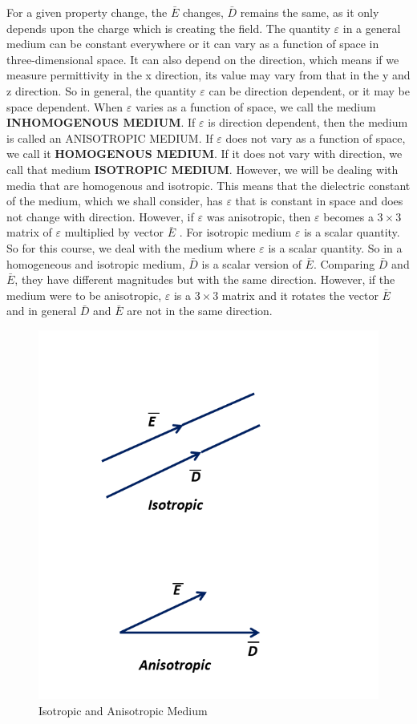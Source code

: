 \begin{mdframed}[ backgroundcolor=lightblue, linewidth=1pt, hidealllines=true]
For a given property change, the $\bar{E}$ changes, $\bar{D}$ remains the same, as it only depends upon the charge which is creating the field. The quantity $\varepsilon$ in a general medium can be constant everywhere or it can vary as a function of space in three-dimensional space. It can also depend on the direction, which means if we measure permittivity in the x direction, its value may vary from that in the y and z direction. So in general, the quantity  $\varepsilon$  can be direction dependent, or it may be space dependent. When  $\varepsilon$  varies as a function of space, we call the medium \textbf{INHOMOGENOUS MEDIUM}. If  $\varepsilon$  is direction dependent, then the medium is called an ANISOTROPIC MEDIUM. If  $\varepsilon$ does not vary as a function of space, we call it \textbf{HOMOGENOUS MEDIUM}. If it does not vary with direction, we call that medium \textbf{ISOTROPIC MEDIUM}.
However, we will be dealing with media that are homogenous and isotropic. This means that the dielectric constant of the medium, which we shall consider, has  $\varepsilon$ that is constant in space and does not change with direction. However, if  $\varepsilon$  was anisotropic, then  $\varepsilon$  becomes a $3\times 3$ matrix of  $\varepsilon$  multiplied by vector $\bar{E}$ . For isotropic medium  $\varepsilon$  is a scalar quantity. So for this course, we deal with the medium where  $\varepsilon$  is a scalar quantity.
So in a homogeneous and isotropic medium,  $\bar{D}$ is a scalar version of  $\bar{E}$. Comparing  $\bar{D}$ and  $\bar{E}$, they have different magnitudes but with the same direction. However, if the medium were to be anisotropic,  $\varepsilon$ is a $3\times 3$ matrix and it rotates the vector  $\bar{E}$ and in general  $\bar{D}$ and  $\bar{E}$ are not in the same direction.

\begin{figure}
\centering
\includegraphics[width=0.7\linewidth]{graphics/isotropicAniso}
\caption{Isotropic and Anisotropic Medium}
\end{figure}


\end{mdframed}
